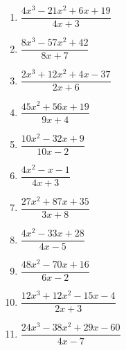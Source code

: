 \documentclass[12pt]{article}
\theoremstyle{definition}
\begin{document}
\begin{multicols}{3}
\begin{enumerate}
  \item $\dfrac{4 x^3 - 21 x^2 + 6 x + 19}{4 x + 3}$  
  \item $\dfrac{8 x^3 - 57 x^2 + 42}{8 x + 7}$
  \item $\dfrac{2 x^3 + 12 x^2 + 4 x - 37}{2 x + 6}$
  \item $\dfrac{45 x^2 + 56 x + 19}{9 x + 4}$
  \item $\dfrac{10 x^2 - 32 x + 9}{10 x - 2}$
  \item $\dfrac{4 x^2 - x - 1}{4 x + 3}$
  \item $\dfrac{27 x^2 + 87 x + 35}{3x + 8}$
  \item $\dfrac{4 x^2 - 33 x + 28}{4 x - 5}$
  \item $\dfrac{48 x^2 - 70 x + 16}{6 x - 2}$
  \item $\dfrac{12 x^3 + 12 x^2 - 15 x - 4}{2 x + 3}$
  \item $\dfrac{24 x^3 - 38 x^2 + 29 x - 60}{4 x - 7}$\label{polydiv_two}
	\end{enumerate}
\end{multicols}
\newpage
\end{document}
